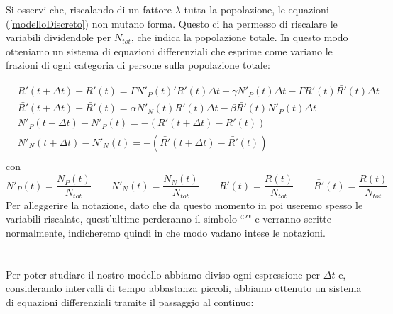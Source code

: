Si osservi che, riscalando di un fattore $\lambda$ tutta la popolazione, le equazioni (\ref{modelloDiscreto}) non mutano forma. Questo ci ha permesso di riscalare le variabili dividendole per $ N_{tot}$, che indica la popolazione totale. In questo modo otteniamo un sistema di equazioni differenziali che esprime come variano le frazioni di ogni categoria di persone sulla popolazione totale:  

\begin{equation} \label{eq: 1.3}
	\begin{aligned}
		&R'(t+\Delta t)-R'(t)=\Gamma N'_P(t)'R'(t)\Delta t+\gamma N'_P(t)\Delta t-\bar{\Gamma}R'(t)\bar{R'}(t)\Delta t\\
	&\bar{R'}(t+\Delta t)-\bar{R'}(t)=\alpha N'_N(t)R'(t)\Delta t-\beta \bar{R'}(t)N'_P(t)\Delta t\\
	&N'_P(t+\Delta t)-N'_P(t)=-(R'(t+\Delta t)-R'(t))\\
	&N'_N(t+\Delta t)-N'_N(t)=-(\bar{R'}(t+\Delta t)-\bar{R'}(t))\\
	\end{aligned}
\end{equation}	
con 
\begin{equation*}
	N'_{P}(t)=\frac{N_{P}(t)}{N_{tot}} \qquad 	N'_{N}(t)=\frac{N_{N}(t)}{N_{tot}} \qquad	R'(t)=\frac{R(t)}{N_{tot}} \qquad	\bar{R'}(t)=\frac{\bar{R}(t)}{N_{tot}} 
\end{equation*}
Per alleggerire la notazione, dato che da questo momento in poi useremo spesso le variabili riscalate, quest'ultime perderanno il simbolo ``$ ' $" e verranno scritte normalmente, indicheremo quindi in che modo vadano intese le notazioni. \\
%
\\\\ 
Per poter studiare il nostro modello abbiamo diviso ogni espressione per $ \Delta t $ e, considerando intervalli di tempo abbastanza piccoli, abbiamo ottenuto un sistema di equazioni differenziali tramite il passaggio al continuo:
